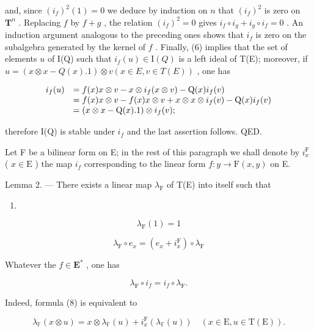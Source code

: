 and, since \((i_f)^2(1) = 0\) we deduce by induction on \(n\) that \((i_f)^2\) is zero on \(\mathbf{T}^n\) . Replacing \(f\) by \(f + g\) , the relation \((i_f)^2 = 0\) gives \(i_f \circ i_g + i_g \circ i_f = 0\) . An induction argument analogous to the preceding ones shows that \(i_f\) is zero on the subalgebra generated by the kernel of \(f\) . Finally, (6) implies that the set of elements \(u\) of I(Q) such that \(i_f(u) \in \mathrm{I}(Q)\) is a left ideal of T(E); moreover, if \(u = (x \otimes x - Q(x).1) \otimes v (x \in E, v \in T(E))\) , one has

\[
\begin{array}{r l} i _ {f} (u) & = f (x) x \otimes v - x \otimes i _ {f} (x \otimes v) - \mathrm{Q} (x) i _ {f} (v) \\ & = f (x) x \otimes v - f (x) x \otimes v + x \otimes x \otimes i _ {f} (v) - \mathrm{Q} (x) i _ {f} (v) \\ & = (x \otimes x - \mathrm{Q} (x). 1) \otimes i _ {f} (v); \end{array}
\]

therefore I(Q) is stable under \(i_{f}\) and the last assertion follows. QED.

Let F be a bilinear form on E; in the rest of this paragraph we shall denote by \(i_x^{\mathrm{F}}\) ( \(x \in \mathrm{E}\) ) the map \(i_f\) corresponding to the linear form \(f: y \to \mathrm{F}(x, y)\) on E.

Lemma 2. --- There exists a linear map \(\lambda_{\mathrm{F}}\) of T(E) into itself such that

\begin{enumerate}
\def\labelenumi{(\arabic{enumi})}
\setcounter{enumi}{6}
\tightlist
\item
\end{enumerate}

\[
\lambda_ {\mathrm{F}} (1) = 1\tag{8}
\]

\[
\lambda_ {\mathrm{F}} \circ e _ {x} = (e _ {x} + i _ {x} ^ {\mathrm{F}}) \circ \lambda_ {\mathrm{F}}\tag{\( (x \in E) \) .}
\]

Whatever the \(f \in \mathbf{E}^*\) , one has

\[
\lambda_ {\mathrm{F}} \circ i _ {f} = i _ {f} \circ \lambda_ {\mathrm{F}}.\tag{9}
\]

Indeed, formula (8) is equivalent to

\[
\lambda_ {\mathbb {F}} (x \otimes u) = x \otimes \lambda_ {\mathbb {F}} (u) + i _ {x} ^ {\mathrm{F}} (\lambda_ {\mathbb {F}} (u)) \quad (x \in \mathrm{E}, u \in \mathrm{T} (\mathrm{E})).\tag{10}
\]

